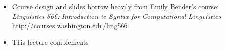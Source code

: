 \documentclass[a4paper,landscape,headrule,footrule]{foils}
\begin{document}

\begin{itemize}
\item Course design and slides borrow heavily from Emily Bender's course:
\textit{Linguistics 566: Introduction to Syntax for Computational Linguistics}
\\ \url{http://courses.washington.edu/ling566}
\item This lecture complements \citet[Chapter 4]{sag:wasow:bender:2003}
\end{itemize}



\end{document}
